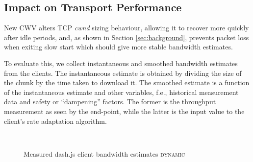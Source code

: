 \documentclass[10pt,sigconf]{acmart}
\begin{document}
\subsection{Impact on Transport Performance} 
\label{sec:transport-impact}

New CWV alters TCP \emph{cwnd} sizing behaviour, allowing it to recover more quickly after idle periods, and, as shown in Section \ref{sec:background}, prevents packet loss when exiting slow start which should give more stable bandwidth estimates. 

To evaluate this, we collect instantaneous and smoothed bandwidth estimates from the clients. The instantaneous estimate is obtained by dividing the size of the chunk by the time taken to download it. The smoothed estimate is a function of the instantaneous estimate and other variables, f.e., historical measurement data and safety or ``dampening'' factors. The former is the throughput measurement as seen by the end-point, while the latter is the input value to the client's rate adaptation algorithm.

\begin{figure}[t!]
  \centering
  \\
  \caption{Measured dash.js client bandwidth estimates \textsc{dynamic}}
  \label{fig:throughput-clients}
\end{figure}
\end{document}
